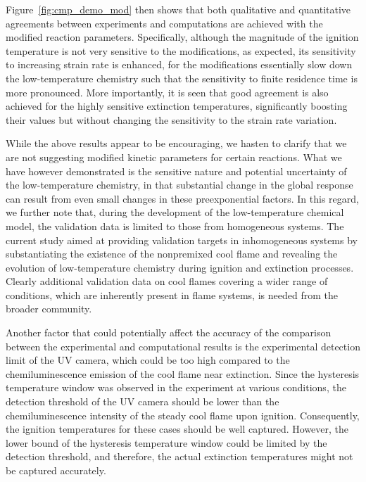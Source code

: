 \documentclass[review,3p,times]{elsarticle}
\begin{document}
Figure~\ref{fig:cmp_demo_mod} then shows that both qualitative and quantitative agreements between experiments and computations are achieved with the modified reaction parameters.  Specifically, although the magnitude of the ignition temperature is not very sensitive to the modifications, as expected, its sensitivity to increasing strain rate is enhanced, for the modifications essentially slow down the low-temperature chemistry such that the sensitivity to finite residence time is more pronounced.  More importantly, it is seen that good agreement is also achieved for the highly sensitive extinction temperatures, significantly boosting their values but without changing the sensitivity to the strain rate variation.

\textcolor{Rev1}{While the above results appear to be encouraging, we hasten to clarify that we are not suggesting modified kinetic parameters for certain reactions. What we have however demonstrated is the sensitive nature and potential uncertainty of the low-temperature chemistry, in that substantial change in the global response can result from even small changes in these preexponential factors. In this regard, we further note that, during the development of the low-temperature chemical model, the validation data is limited to those from homogeneous systems.  The current study aimed at providing validation targets in inhomogeneous systems by substantiating the existence of the nonpremixed cool flame and revealing the evolution of low-temperature chemistry during ignition and extinction processes.  Clearly additional validation data on cool flames covering a wider range of conditions, which are inherently present in flame systems, is needed from the broader community.}

Another factor that could potentially affect the accuracy of the comparison between the experimental and computational results is the experimental detection limit of the UV camera, which could be too high compared to the chemiluminescence emission of the cool flame near extinction.  Since the hysteresis temperature window was observed in the experiment at various conditions, the detection threshold of the UV camera should be lower than the chemiluminescence intensity of the steady cool flame upon ignition.  Consequently, the ignition temperatures for these cases should be well captured.  However, the lower bound of the hysteresis temperature window could be limited by the detection threshold, and therefore, the actual extinction temperatures might not be captured accurately.
\end{document}
